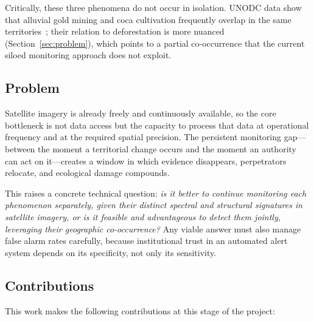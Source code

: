 \documentclass{article}
\begin{document}
Critically, these three phenomena do not occur in isolation.
UNODC data show that alluvial gold mining and coca cultivation frequently overlap
in the same territories~\cite{unodc_evoa2022}; their relation to deforestation is
more nuanced (Section~\ref{sec:problem}), which points to a partial co-occurrence
that the current siloed monitoring approach does not exploit.

\subsection{Problem}

Satellite imagery is already freely and continuously available, so the core
bottleneck is not data access but the capacity to process that data at operational
frequency and at the required spatial precision.
The persistent monitoring gap---between the moment a territorial change occurs and
the moment an authority can act on it---creates a window in which evidence
disappears, perpetrators relocate, and ecological damage compounds.

This raises a concrete technical question: \textit{is it better to continue
monitoring each phenomenon separately, given their distinct spectral and
structural signatures in satellite imagery, or is it feasible and advantageous to
detect them jointly, leveraging their geographic co-occurrence?}
Any viable answer must also manage false alarm rates carefully, because
institutional trust in an automated alert system depends on its specificity,
not only its sensitivity.

\subsection{Contributions}

This work makes the following contributions at this stage of the project:
\end{document}
